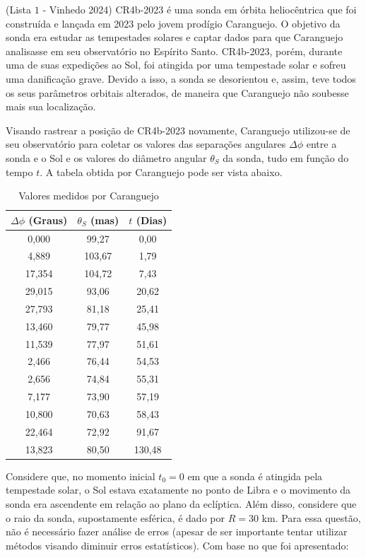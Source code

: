 \documentclass[11pt]{article}
\begin{document}
\begin{pproblem}(Lista \(1\) - Vinhedo 2024) 
    CR4b-2023 é uma sonda em órbita heliocêntrica que foi construída e lançada em 2023 pelo jovem prodígio Caranguejo. O objetivo da sonda era estudar as tempestades solares e captar dados para que Caranguejo analisasse em seu observatório no Espírito Santo. CR4b-2023, porém, durante uma de suas expedições ao Sol, foi atingida por uma tempestade solar e sofreu uma danificação grave. Devido a isso, a sonda se desorientou e, assim, teve todos os seus parâmetros orbitais alterados, de maneira que Caranguejo não soubesse mais sua localização.

    Visando rastrear a posição de CR4b-2023 novamente, Caranguejo utilizou-se de seu observatório para coletar os valores das separações angulares \(\Delta\phi\) entre a sonda e o Sol e os valores do diâmetro angular \(\theta_S\) da sonda, tudo em função do tempo \(t\). A tabela obtida por Caranguejo pode ser vista abaixo.

    \begin{table}[H]
        \centering
        \begin{tabular}{|c|c|c|}
            \hline
            \(\Delta\phi\) (Graus) & \(\theta_S\) (mas) & \(t\) (Dias) \\
            \hline
            0,000 & 99,27 & 0,00 \\
            4,889 & 103,67 & 1,79 \\
            17,354 & 104,72 & 7,43 \\
            29,015 & 93,06 & 20,62 \\
            27,793 & 81,18 & 25,41 \\
            13,460 & 79,77 & 45,98 \\
            11,539 & 77,97 & 51,61 \\
            2,466 & 76,44 & 54,53 \\
            2,656 & 74,84 & 55,31 \\
            7,177 & 73,90 & 57,19 \\
            10,800 & 70,63 & 58,43 \\
            22,464 & 72,92 & 91,67 \\
            13,823 & 80,50 & 130,48 \\
            \hline
        \end{tabular}
        \caption{Valores medidos por Caranguejo}
    \end{table}

    Considere que, no momento inicial \(t_0 = 0\) em que a sonda é atingida pela tempestade solar, o Sol estava exatamente no ponto de Libra e o movimento da sonda era ascendente em relação ao plano da eclíptica. Além disso, considere que o raio da sonda, supostamente esférica, é dado por \(R = 30\) km. Para essa questão, não é necessário fazer análise de erros (apesar de ser importante tentar utilizar métodos visando diminuir erros estatísticos). Com base no que foi apresentado:


\end{pproblem}
\end{document}
